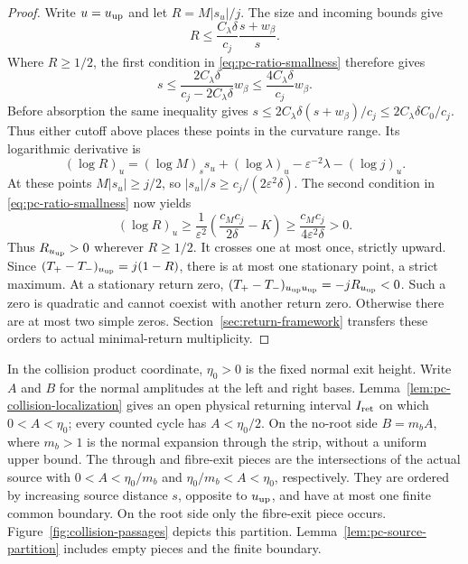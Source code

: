 \begin{proof}
Write $u=u_{\rm up}$ and let $R=M|s_u|/j$. The size and incoming bounds give
\[
 R\le\frac{C_\lambda\delta}{c_j}\frac{s+w_\beta}{s}.
\]
Where $R\ge1/2$, the first condition in \eqref{eq:pc-ratio-smallness}
therefore gives
\begin{equation}\label{eq:pc-ratio-source-bound}
 s\le\frac{2C_\lambda\delta}{c_j-2C_\lambda\delta}w_\beta
   \le\frac{4C_\lambda\delta}{c_j}w_\beta.
\end{equation}
Before absorption the same inequality gives
$s\le2C_\lambda\delta(s+w_\beta)/c_j\le2C_\lambda\delta C_0/c_j$.
Thus either cutoff above places these points in the curvature range.
Its logarithmic derivative is
\[
 (\log R)_u=(\log M)_s s_u+
                 (\log\lambda)_u-\varepsilon^{-2}\lambda-(\log j)_u.
\]
At these points $M|s_u|\ge j/2$, so
$|s_u|/s\ge c_j/(2\varepsilon^2\delta)$. The second condition in
\eqref{eq:pc-ratio-smallness} now yields
\[
 (\log R)_u\ge\frac1{\varepsilon^2}
       \left(\frac{c_Mc_j}{2\delta}-K\right)
       \ge\frac{c_Mc_j}{4\varepsilon^2\delta}>0.
\]
Thus $R_{u_{\rm up}}>0$ wherever $R\ge1/2$.
It crosses one at most once, strictly upward.
Since $(T_+-T_-)_{u_{\rm up}}=j(1-R)$, there is at most one stationary
point, a strict maximum. At a stationary return zero,
$(T_+-T_-)_{u_{\rm up}u_{\rm up}}=-jR_{u_{\rm up}}<0$.
Such a zero is quadratic and cannot coexist with another return zero.
Otherwise there are at most two simple zeros. Section~\ref{sec:return-framework}
transfers these orders to actual minimal-return multiplicity.
\end{proof}

In the collision product coordinate, $\eta_0>0$ is the fixed normal
exit height. Write $A$ and $B$ for the normal amplitudes at the left
and right bases. Lemma~\ref{lem:pc-collision-localization} gives an
open physical returning interval $I_{\rm ret}$ on which $0<A<\eta_0$;
every counted cycle has $A<\eta_0/2$.
On the no-root side $B=m_bA$, where $m_b>1$ is the normal expansion
through the strip, without a uniform upper bound. The through and
fibre-exit pieces are the intersections of the actual source with
$0<A<\eta_0/m_b$ and $\eta_0/m_b<A<\eta_0$, respectively.
They are ordered by increasing source distance $s$, opposite to
$u_{\rm up}$, and have at most one finite common boundary.
On the root side only the fibre-exit piece occurs.
Figure~\ref{fig:collision-passages} depicts this partition.
Lemma~\ref{lem:pc-source-partition} includes empty pieces and the finite boundary.

